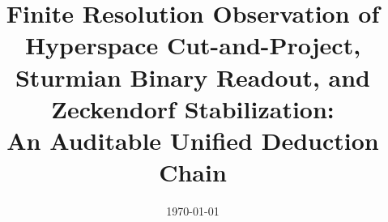 \documentclass[11pt,letterpaper]{article}
\title{Finite Resolution Observation of Hyperspace Cut-and-Project, Sturmian Binary Readout, and Zeckendorf Stabilization:\\\large An Auditable Unified Deduction Chain}
\author{}
\date{\today}
\begin{document}
\maketitle
















\FloatBarrier
\appendix









\FloatBarrier

\end{document}
